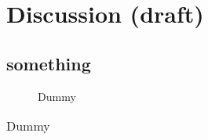 \chapter{Discussion (draft)}

\section{something}





\begin{figure}[ht]
\caption{Dummy}
\label{fig:dum1}
\end{figure}

\begin{table}[ht]
\caption{Dummy}
\begin{tabular}{|c|c|}
\end{tabular}
\label{tab:dum1}
\end{table}
